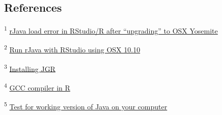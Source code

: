 \documentclass[10,portrait]{article}
\begin{document}
\hypertarget{references}{\subsection{References}\label{references}}

\textsuperscript{1}
\href{https://stackoverflow.com/questions/30738974/rjava-load-error-in-rstudio-r-after-upgrading-to-osx-yosemite}{rJava
load error in RStudio/R after ``upgrading'' to OSX Yosemite}

\textsuperscript{2}
\href{http://paulklemm.com/blog/2015-02-20-run-rjava-with-rstudio-under-osx-10-dot-10/}{Run
rJava with RStudio using OSX 10.10}

\textsuperscript{3} \href{https://github.com/markush81/JGR}{Installing
JGR}

\textsuperscript{4}
\href{https://stackoverflow.com/questions/1616983/building-r-packages-using-alternate-gcc}{GCC
compiler in R}

\textsuperscript{5}
\href{https://stackoverflow.com/questions/14915898/rnetlogo-function-nlstart-fails-to-launch-gui}{Test
for working version of Java on your computer}

\printbibliography
\end{document}
